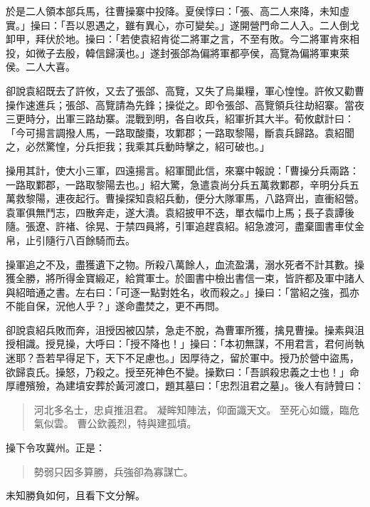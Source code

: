 於是二人領本部兵馬，往曹操寨中投降。夏侯惇曰：「張、高二人來降，未知虛實。」操曰：「吾以恩遇之，雖有異心，亦可變矣。」遂開營門命二人入。二人倒戈卸甲，拜伏於地。操曰：「若使袁紹肯從二將軍之言，不至有敗。今二將軍肯來相投，如微子去殷，韓信歸漢也。」遂封張郃為偏將軍都亭侯，高覽為偏將軍東萊侯。二人大喜。

卻說袁紹既去了許攸，又去了張郃、高覽，又失了烏巢糧，軍心惶惶。許攸又勸曹操作速進兵；張郃、高覽請為先鋒；操從之。即令張郃、高覽領兵往劫紹寨。當夜三更時分，出軍三路劫寨。混戰到明，各自收兵，紹軍折其大半。荀攸獻計曰：「今可揚言調撥人馬，一路取酸棗，攻鄴郡；一路取黎陽，斷袁兵歸路。袁紹聞之，必然驚惶，分兵拒我；我乘其兵動時擊之，紹可破也。」

操用其計，使大小三軍，四遠揚言。紹軍聞此信，來寨中報說：「曹操分兵兩路：一路取鄴郡，一路取黎陽去也。」紹大驚，急遣袁尚分兵五萬救鄴郡，辛明分兵五萬救黎陽，連夜起行。曹操探知袁紹兵動，便分大隊軍馬，八路齊出，直衝紹營。袁軍俱無鬥志，四散奔走，遂大潰。袁紹披甲不迭，單衣幅巾上馬；長子袁譚後隨。張遼、許褚、徐晃、于禁四員將，引軍追趕袁紹。紹急渡河，盡棄圖書車仗金帛，止引隨行八百餘騎而去。

操軍追之不及，盡獲遺下之物。所殺八萬餘人，血流盈溝，溺水死者不計其數。操獲全勝，將所得金寶緞疋，給賞軍士。於圖書中檢出書信一束，皆許都及軍中諸人與紹暗通之書。左右曰：「可逐一點對姓名，收而殺之。」操曰：「當紹之強，孤亦不能自保，況他人乎？」遂命盡焚之，更不再問。

卻說袁紹兵敗而奔，沮授因被囚禁，急走不脫，為曹軍所獲，擒見曹操。操素與沮授相識。授見操，大呼曰：「授不降也！」操曰：「本初無謀，不用君言，君何尚執迷耶？吾若早得足下，天下不足慮也。」因厚待之，留於軍中。授乃於營中盜馬，欲歸袁氏。操怒，乃殺之。授至死神色不變。操歎曰：「吾誤殺忠義之士也！」命厚禮殯殮，為建墳安葬於黃河渡口，題其墓曰：「忠烈沮君之墓」。後人有詩贊曰：

\begin{quote}
河北多名士，忠貞推沮君。
凝眸知陣法，仰面識天文。
至死心如鐵，臨危氣似雲。
曹公欽義烈，特與建孤墳。
\end{quote}

操下令攻冀州。正是：

\begin{quote}
勢弱只因多算勝，兵強卻為寡謀亡。
\end{quote}

未知勝負如何，且看下文分解。

